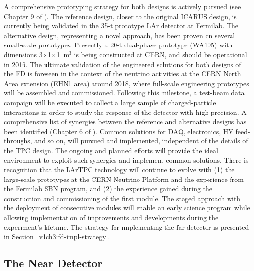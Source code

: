 A  comprehensive prototyping strategy for both designs is actively pursued (see Chapter 9 of \voldune).
The reference design, closer to the original ICARUS design, is currently being validated in the 35-t prototype 
LAr detector at Fermilab.  The alternative design, representing a novel approach, has been proven on several
small-scale prototypes. Presently
a 20-t dual-phase prototype (WA105) with dimensions 3$\times$1$\times$1~m$^3$ is being constructed at CERN,  
and should be operational in 2016. 
The ultimate validation of the engineered solutions for both designs of the FD is foreseen in
the context of the neutrino activities at the CERN North Area extension (EHN1 area) around 2018, 
where full-scale engineering prototypes will be 
assembled and commissioned. Following this milestone, a test-beam data 
campaign will be executed %
to collect a large sample of charged-particle interactions
in order to study the response of the detector with high precision.
A comprehensive list of synergies between the reference and alternative designs has been identified (Chapter 6 of \voldune). Common solutions for DAQ, electronics, HV feed-throughs, and so on, will pursued and implemented, independent of the details of the TPC design. The ongoing and planned efforts %
will
provide the ideal environment to exploit such synergies and implement common solutions.
There is recognition that the LArTPC technology will continue to evolve with (1) the large-scale prototypes at the CERN Neutrino Platform and the experience from the Fermilab SBN program, and (2) the experience gained during the construction and commissioning of the first  module. 
The staged approach with the deployment of consecutive modules will
enable an early science program while allowing implementation of improvements and developments  during the experiment's lifetime.
The strategy for implementing
the far detector is presented in Section~\ref{v1ch3:fd-impl-strategy}.

\subsection{The Near Detector} %

